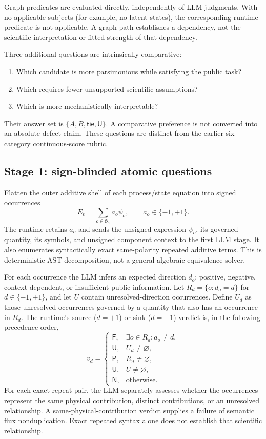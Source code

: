 \documentclass[11pt]{article}
\newcommand{\PASS}{\mathsf{P}}
\newcommand{\FAIL}{\mathsf{F}}
\newcommand{\UNK}{\mathsf{U}}
\newcommand{\NA}{\mathsf{N}}
\begin{document}
Graph predicates are evaluated directly, independently of LLM judgments. With no
applicable subjects (for example, no latent states), the corresponding runtime
predicate is not applicable. A graph path establishes a dependency, not the
scientific interpretation or fitted strength of that dependency.

Three additional questions are intrinsically comparative:
\begin{enumerate}
 \item Which candidate is more parsimonious while satisfying the public task?
 \item Which requires fewer unsupported scientific assumptions?
 \item Which is more mechanistically interpretable?
\end{enumerate}
Their answer set is $\{A,B,\mathsf{tie},\UNK\}$. A comparative preference is not
converted into an absolute defect claim. These questions are distinct from the
earlier six-category continuous-score rubric.

\subsection{Stage 1: sign-blinded atomic questions}
Flatten the outer additive shell of each process/state equation into signed
occurrences
\begin{equation}
 E_v=\sum_{o\in\mathcal O_v} a_o\psi_o,\qquad a_o\in\{-1,+1\}.
\end{equation}
The runtime retains $a_o$ and sends the unsigned expression $\psi_o$, its governed
quantity, its symbols, and unsigned component context to the first LLM stage.
It also enumerates syntactically exact same-polarity repeated additive terms.
This is deterministic AST decomposition, not a general algebraic-equivalence
solver.

For each occurrence the LLM infers an expected direction $d_o$: positive,
negative, context-dependent, or insufficient-public-information. Let
$R_d=\{o:d_o=d\}$ for $d\in\{-1,+1\}$, and let $U$ contain unresolved-direction
occurrences. Define $U_d$ as those unresolved occurrences governed by a quantity
that also has an occurrence in $R_d$. The runtime's source ($d=+1$) or sink
($d=-1$) verdict is, in the following precedence order,
\begin{equation}
 v_d=\begin{cases}
 \FAIL,&\exists o\in R_d:a_o\ne d,\\
 \UNK,&U_d\ne\varnothing,\\
 \PASS,&R_d\ne\varnothing,\\
 \UNK,&U\ne\varnothing,\\
 \NA,&\text{otherwise}.
 \end{cases}
 \label{eq:atomic-role}
\end{equation}
For each exact-repeat pair, the LLM separately assesses whether the occurrences
represent the same physical contribution, distinct contributions, or an
unresolved relationship. A same-physical-contribution verdict supplies a failure
of semantic flux nonduplication. Exact repeated syntax alone does not establish
that scientific relationship.
\end{document}
